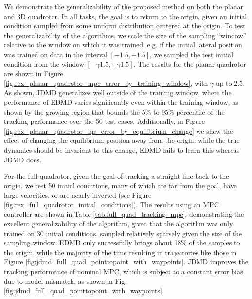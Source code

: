 \documentclass[../root.tex]{subfiles}
\newcommand{\changed}[1]{{\color{black} #1}}
\begin{document}
We demonstrate the generalizability of the proposed method on both the planar and 3D 
quadrotor. In all tasks, the goal is to return to the origin, given an initial condition 
sampled from some uniform distribution centered at the origin. To test the generalizability
of the algorithms, we scale the size of the sampling ``window'' relative to the window on 
which it was trained, 
e.g. if the initial lateral position was trained on 
data in the interval $[-1.5,+1.5]$, we sampled the test initial condition from the window 
$[-\gamma 1.5, +\gamma 1.5]$. The results for the planar quadrotor 
are shown in Figure 
\ref{fig:rex_planar_quadrotor_mpc_error_by_training_window}, \changed{with $\gamma$ up to 2.5}. 
\changed{As shown, JDMD generalizes well outside of the training window, 
where the performance of EDMD varies significantly even within the training window, as shown by
the growing region that bounds the 5\% to 95\% percentile of the tracking performance over the 50 test cases.}
Additionally, in Figure \ref{fig:rex_planar_quadrotor_lqr_error_by_equilibrium_change} we 
show the effect of changing the equilibrium position away from the origin: while the true 
dynamics should be invariant to this change, EDMD fails to learn this whereas JDMD does.

For the full quadrotor, given the goal of tracking a straight line back to the origin, we
test 50 initial conditions, many of which are far from the goal, have large velocities, or
are nearly inverted (see Figure \ref{fig:rex_full_quadrotor_initial_conditions}). 
The results using an MPC controller are shown in Table \ref{tab:full_quad_tracking_mpc}, 
demonstrating the excellent generalizability of the algorithm, given that the algorithm 
was only trained on 30 initial conditions, sampled relatively sparsely given the size of the 
sampling window. EDMD only successfully brings about 18\% of the samples to the origin, 
while the majority of the time resulting in trajectories like those in Figure 
\ref{fig:jdmd_full_quad_pointtopoint_with_waypoints}. \changed{JDMD improves the tracking 
performance of nominal MPC, which is subject to a constant error bias due to model mismatch, 
as shown in  Fig. \ref{fig:jdmd_full_quad_pointtopoint_with_waypoints}.}
\end{document}
